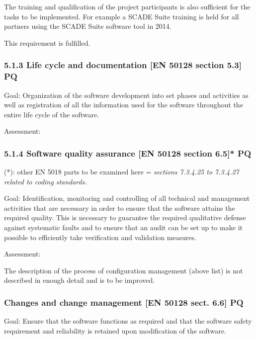 The training and qualification of the project participants is also sufficient for the tasks to be implemented. For
example a SCADE Suite training is held for all partners using the SCADE Suite software tool in 2014.

This requirement is fulfilled.

\subsubsection[5.1.3 Life cycle and documentation [EN 50128 section 5.3{]} PQ]{5.1.3 Life cycle and documentation [EN
50128 section 5.3] PQ}
Goal: Organization of the software development into set phases and activities as well as registration of all the
information used for the software throughout the entire life cycle of the software.

Assessment:


\bigskip


\bigskip


\bigskip

\subsubsection[5.1.4 Software quality assurance [EN 50128 section 6.5{]}* PQ]{5.1.4 Software quality assurance [EN 50128
section 6.5]* PQ}
(*): other EN 5018 parts to be examined here = \textit{sections 7.3.4.25 to 7.3.4.27 related to coding standards. }

Goal: Identification, monitoring and controlling of all technical and management activities that are necessary in order
to ensure that the software attains the required quality. This is necessary to guarantee the required qualitative
defense against systematic faults and to ensure that an audit can be set up to make it possible to efficiently take
verification and validation measures. 


\bigskip

Assessment:


\bigskip

The description of the process of configuration management (above list) is not described in enough detail and is to be
improved.


\bigskip

\subsubsection{Changes and change management [EN 50128 sect. 6.6] PQ}
Goal: Ensure that the software functions as required and that the software safety requirement and reliability is
retained upon modification of the software.


